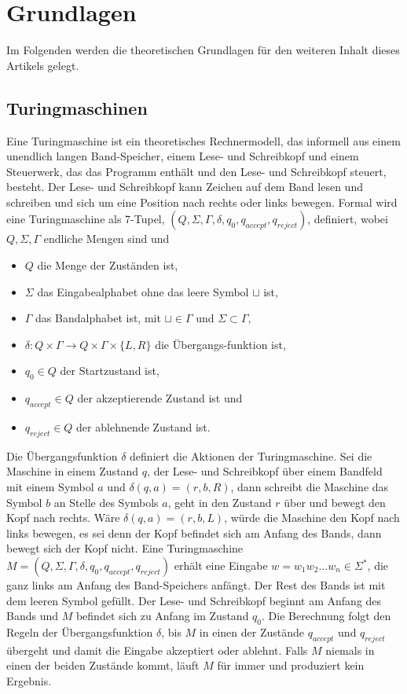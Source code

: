 \documentclass[conference,compsoc,final,a4paper]{IEEEtran}
\begin{document}
\section{Grundlagen}
Im Folgenden werden die theoretischen Grundlagen für den weiteren Inhalt dieses Artikels gelegt.

\subsection{Turingmaschinen}
Eine Turingmaschine ist ein theoretisches Rechnermodell, das informell aus einem unendlich langen Band-Speicher, einem Lese- und Schreibkopf und einem Steuerwerk, das das Programm enthält und den Lese- und Schreibkopf steuert, besteht. Der Lese- und Schreibkopf kann Zeichen auf dem Band lesen und schreiben und sich um eine Position nach rechts oder links bewegen. Formal wird eine Turingmaschine als 7-Tupel, $(Q, \Sigma, \Gamma, \delta, q_{0}, q_{accept}, q_{reject})$, definiert, wobei $Q, \Sigma, \Gamma$ endliche Mengen sind und
\begin{itemize}
  \item $Q$ die Menge der Zuständen ist,
  \item $\Sigma$ das Eingabealphabet ohne das leere Symbol $\sqcup$ ist,
  \item $\Gamma$ das Bandalphabet ist, mit $\sqcup \in \Gamma$ und $\Sigma \subset \Gamma$,
  \item $\delta: Q \times \Gamma \longrightarrow Q \times \Gamma \times \{L,R\}$ die Übergangs-funktion ist,
  \item $q_{0} \in Q$ der Startzustand ist,
  \item $q_{accept} \in Q$ der akzeptierende Zustand ist und
  \item $q_{reject} \in Q$ der ablehnende Zustand ist.
\end{itemize}
Die Übergangsfunktion $\delta$ definiert die Aktionen der Turingmaschine. Sei die Maschine in einem Zustand $q$, der Lese- und Schreibkopf über einem Bandfeld mit einem Symbol $a$ und $\delta(q,a) = (r,b,R)$, dann schreibt die Maschine das Symbol $b$ an Stelle des Symbols $a$, geht in den Zustand $r$ über und bewegt den Kopf nach rechts. Wäre $\delta(q,a) = (r,b,L)$, würde die Maschine den Kopf nach links bewegen, es sei denn der Kopf befindet sich am Anfang des Bands, dann bewegt sich der Kopf nicht. 
Eine Turingmaschine $M = (Q, \Sigma, \Gamma, \delta, q_{0}, q_{accept}, q_{reject})$ erhält eine Eingabe $w = w_1 w_2 ... w_n \in \Sigma^*$, die ganz links am Anfang des Band-Speichers anfängt. Der Rest des Bands ist mit dem leeren Symbol gefüllt. Der Lese- und Schreibkopf beginnt am Anfang des Bands und $M$ befindet sich zu Anfang im Zustand $q_0$. Die Berechnung folgt den Regeln der Übergangsfunktion $\delta$, bis $M$ in einen der Zustände $q_{accept}$ und $q_{reject}$ übergeht und damit die Eingabe akzeptiert oder ablehnt. Falls $M$ niemals in einen der beiden Zustände kommt, läuft $M$ für immer und produziert kein Ergebnis. \cite{theory_of_computing}
\end{document}
